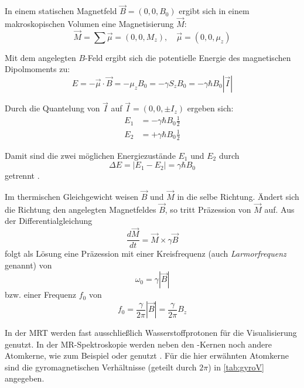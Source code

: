 In einem statischen Magnetfeld $\vec{B}=(0,0,B_0)$ ergibt sich in einem makroskopischen Volumen eine Magnetisierung $\vec{M}$:
\begin{equation}
	\vec{M} = \sum \vec{\mu} = (0,0,M_z), \quad \vec{\mu}=(0,0,\mu_z)
\end{equation}

Mit dem angelegten $B$-Feld ergibt sich die potentielle Energie des magnetischen Dipolmoments zu:
\begin{equation}
	E=-\vec{\mu} \cdot \vec{B} = -\mu_z B_0 = -\gamma S_z B_0 = -\gamma \hbar B_0 |\vec{I}|
\end{equation}

Durch die Quantelung von $\vec{I}$ auf $\vec{I}=(0,0,\pm I_z)$ ergeben sich:
\begin{subequations}
	\begin{align}
	E_1 & = -\gamma \hbar B_0 \frac{1}{2} \\
	E_2 & = +\gamma \hbar B_0 \frac{1}{2}
	\end{align}
\end{subequations}

Damit sind die zwei möglichen Energiezustände $E_1$ und $E_2$ durch
\begin{equation}
	\Delta E = |E_1 - E_2| = \gamma \hbar B_0
\end{equation}
getrennt \cite[S.~ 56]{Nishimura1996}.

Im thermischen Gleichgewicht weisen $\vec{B}$ und $\vec{M}$ in die selbe Richtung. Ändert sich die Richtung den angelegten Magnetfeldes $\vec{B}$, so tritt Präzession von $\vec{M}$ auf. Aus der Differentialgleichung
\begin{equation}
\label{eq:Mdgl}
	\frac{d\vec{M}}{dt}=\vec{M} \times \gamma \vec{B}
\end{equation}
folgt als Lösung eine Präzession mit einer Kreisfrequenz (auch \textit{Larmorfrequenz} genannt) von
\begin{equation}
	\omega_0=\gamma |\vec{B}|
\end{equation}
bzw. einer Frequenz $f_0$ von
\begin{equation}
	f_0=\frac{\gamma}{2\pi} |\vec{B}| = \frac{\gamma}{2\pi} B_z
\end{equation}

In der MRT werden fast ausschließlich Wasserstoffprotonen für die Visualisierung genutzt. In der MR-Spektroskopie werden neben den -Kernen noch andere Atomkerne, wie zum Beispiel  oder  genutzt \cite{Andrade2014}. Für die hier erwähnten Atomkerne sind die gyromagnetischen Verhältnisse (geteilt durch $2\pi$) in \autoref{tab:gyroV} angegeben.

